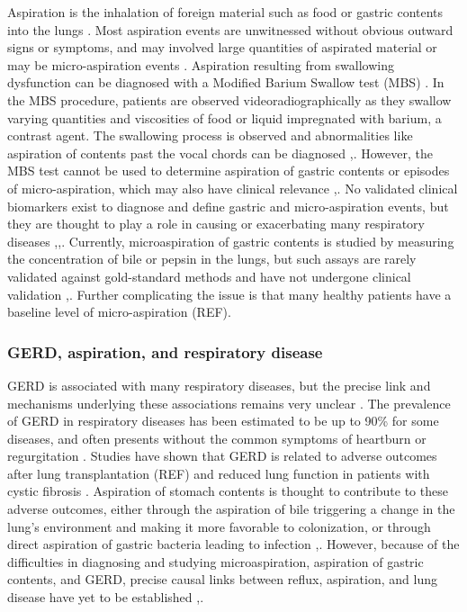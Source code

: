 \documentclass[12pt]{article}
\begin{document}
Aspiration is the inhalation of foreign material such as food or gastric contents into the lungs \cite{raghavendran-asp_injury-2011}. Most aspiration events are unwitnessed without obvious outward signs or symptoms, and may involved large quantities of aspirated material or may be micro-aspiration events \cite{raghavendran-asp_injury-2011}. Aspiration resulting from swallowing dysfunction can be diagnosed with a Modified Barium Swallow test (MBS) \cite{martinharris-mbs-2008}. In the MBS procedure, patients are observed videoradiographically as they swallow varying quantities and viscosities of food or liquid impregnated with barium, a contrast agent. The swallowing process is observed and abnormalities like aspiration of contents past the vocal chords can be diagnosed \cite{martinharris-clinical_mbs-2000},\cite{martinharris-mbs-2008}. However, the MBS test cannot be used to determine aspiration of gastric contents or episodes of micro-aspiration, which may also have clinical relevance \cite{raghavendran-asp_injury-2011},\cite{lee-pulm_asp-2014}. No validated clinical biomarkers exist to diagnose and define gastric and micro-aspiration events\cite{lee-pulm_asp-2014}, but they are thought to play a role in causing or exacerbating many respiratory diseases \cite{reen-aspirated_bile-2014},\cite{almomani-cf_sputum-2016},\cite{houghton-microaspiration-2016}. Currently, microaspiration of gastric contents is studied by measuring the concentration of bile or pepsin in the lungs, but such assays are rarely validated against gold-standard methods and have not undergone clinical validation \cite{houghton-microaspiration-2016},\cite{lee-pulm_asp-2014}. Further complicating the issue is that many healthy patients have a baseline level of micro-aspiration (REF).

\subsubsection{GERD, aspiration, and respiratory disease}
GERD is associated with many respiratory diseases, but the precise link and mechanisms underlying these associations remains very unclear \cite{houghton-microaspiration-2016}. The prevalence of GERD in respiratory diseases has been estimated to be up to 90\% for some diseases, and often presents without the common symptoms of heartburn or regurgitation \cite{houghton-microaspiration-2016}. Studies have shown that GERD is related to adverse outcomes after lung transplantation (REF) and reduced lung function in patients with cystic fibrosis \cite{almomani-cf_sputum-2016}. Aspiration of stomach contents is thought to contribute to these adverse outcomes, either through the aspiration of bile triggering a change in the lung's environment and making it more favorable to colonization, or through direct aspiration of gastric bacteria leading to infection \cite{almomani-cf_sputum-2016},\cite{reen-aspirated_bile-2014}. However, because of the difficulties in diagnosing and studying microaspiration, aspiration of gastric contents, and GERD, precise causal links between reflux, aspiration, and lung disease have yet to be established \cite{almomani-cf_sputum-2016},\cite{houghton-microaspiration-2016}.
\end{document}
